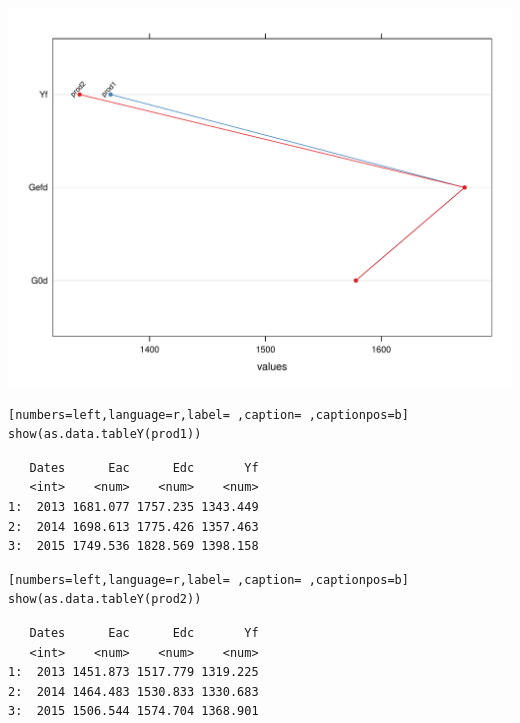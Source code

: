 \begin{center}
\includegraphics[width=\textwidth]{figuras/ejemplos4.pdf}
\end{center}
\begin{lstlisting}[numbers=left,language=r,label= ,caption= ,captionpos=b]
show(as.data.tableY(prod1))
\end{lstlisting}

\begin{verbatim}
   Dates      Eac      Edc       Yf
   <int>    <num>    <num>    <num>
1:  2013 1681.077 1757.235 1343.449
2:  2014 1698.613 1775.426 1357.463
3:  2015 1749.536 1828.569 1398.158
\end{verbatim}


\begin{lstlisting}[numbers=left,language=r,label= ,caption= ,captionpos=b]
show(as.data.tableY(prod2))
\end{lstlisting}

\begin{verbatim}
   Dates      Eac      Edc       Yf
   <int>    <num>    <num>    <num>
1:  2013 1451.873 1517.779 1319.225
2:  2014 1464.483 1530.833 1330.683
3:  2015 1506.544 1574.704 1368.901
\end{verbatim}

